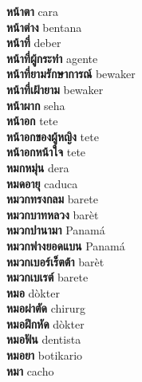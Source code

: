 \textbf{ หน้าตา  } cara \\
\textbf{ หน้าต่าง  } bentana \\
\textbf{ หน้าที่  } deber \\
\textbf{ หน้าที่ผู้กระทำ  } agente \\
\textbf{ หน้าที่ยามรักษาการณ์  } bewaker \\
\textbf{ หน้าที่เฝ้ายาม  } bewaker \\
\textbf{ หน้าผาก  } seha \\
\textbf{ หน้าอก  } tete \\
\textbf{ หน้าอกของผู้หญิง  } tete \\
\textbf{ หน้าอกหน้าใจ  } tete \\
\textbf{ หมกหมุ่น  } dera \\
\textbf{ หมดอายุ  } caduca \\
\textbf{ หมวกทรงกลม  } barete \\
\textbf{ หมวกบาทหลวง  } barèt \\
\textbf{ หมวกปานามา  } Panamá \\
\textbf{ หมวกฟางยอดแบน  } Panamá \\
\textbf{ หมวกเบอร์เร็ตต้า  } barèt \\
\textbf{ หมวกเบเรต์  } barete \\
\textbf{ หมอ  } dòkter \\
\textbf{ หมอผ่าตัด  } chirurg \\
\textbf{ หมอฝึกหัด  } dòkter \\
\textbf{ หมอฟัน  } dentista \\
\textbf{ หมอยา  } botikario \\
\textbf{ หมา  } cacho \\
